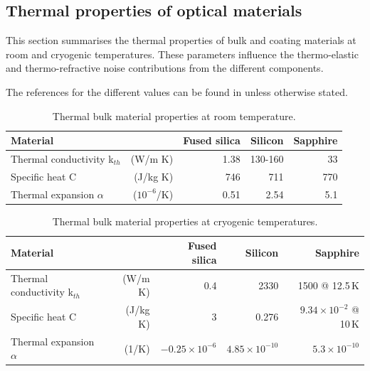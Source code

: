 \FloatBarrier
\subsection{Thermal properties of optical materials}
\label{app:thermdat}

This section summarises the thermal properties of bulk and coating materials at room and cryogenic temperatures. These parameters influence the thermo-elastic and thermo-refractive noise contributions from the different components.

The references for the different values can be found in \cite{Franc2009, Nawrodt2009_ET} unless otherwise stated.

\begin{table}[h!]
\begin{center}
\begin{tabular}{|l r||r|r|r|}
  \hline
    {\large\strut} Material  & & Fused silica & Silicon & Sapphire \\
  \hline
  \hline
   {\large\strut} Thermal conductivity k$_{th}$ & (W/m K) & 1.38  & 130-160  & 33 \\
   {\large\strut} Specific heat C & (J/kg K) & 746  & 711  & 770\\
   {\large\strut} Thermal expansion $\alpha$ & ($10^{-6}$/K) &  0.51  & 2.54 & 5.1\\
     \hline
\end{tabular}
\end{center}
\caption{Thermal bulk material properties at room temperature.}
\label{tab:Therm_Bulk_Param_room}
\end{table}

\begin{table}[h!]
\begin{center}
\begin{tabular}{|l r||r|r|r|}
  \hline
    {\large\strut} Material  & & Fused silica & Silicon & Sapphire \\
  \hline
  \hline
   {\large\strut} Thermal conductivity k$_{th}$ & (W/m K) & 0.4 & 2330 & 1500 @ 12.5\,K \\
   {\large\strut} Specific heat C & (J/kg K) & 3 & 0.276 & $9.34\times 10^{-2}$ @ 10\,K \\
   {\large\strut} Thermal expansion $\alpha$ & (1/K) &  $ -0.25\times 10^{-6}$ & $4.85\times10^{-10}$ & $5.3\times10^{-10}$ \\
  \hline
\end{tabular}
\caption{Thermal bulk material properties at cryogenic temperatures. }
\end{center}
\label{tab:Therm_Bulk_Param_cryo}
\end{table}

